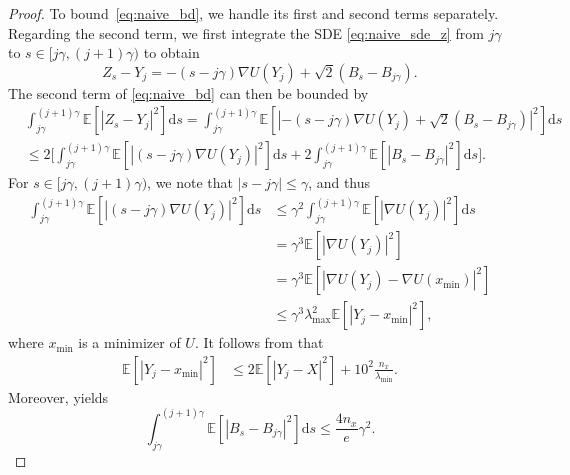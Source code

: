 \documentclass[11pt]{article}
\theoremstyle{plain}
\theoremstyle{definition}
\theoremstyle{remark}
\begin{document}
\begin{proof}
To bound~\eqref{eq:naive_bd}, we handle its first and second terms   separately. 
Regarding the second term, we first integrate the SDE \eqref{eq:naive_sde_z} from $j\gamma$ to $s \in [j \gamma, (j+1)\gamma )$  to obtain 
\begin{equation}\nonumber
 Z_s - Y_j   =    -(s - j\gamma)  \nabla U(Y_j) + \sqrt{2} (B_s - B_{j\gamma}).  
\end{equation}
The second term of \eqref{eq:naive_bd} can then be bounded  by
\begin{equation}\label{eq:naive_bd0}
\begin{split}
&\int_{j\gamma}^{(j+1) \gamma} 
\mathbb{E} [ | Z_s-Y_j|^2 ] \mathrm{d} s 
= \int_{j\gamma}^{(j+1) \gamma}\mathbb{E} [ | 
-(s - j\gamma)  \nabla U(Y_j) + \sqrt{2} (B_s - B_{j\gamma})
|^2 ] \mathrm{d} s \\
&\leq 2\bigg [
 \int_{j\gamma}^{(j+1) \gamma} \mathbb{E} [ | 
(s - j\gamma)  \nabla U(Y_j) |^2] \mathrm{d} s
+ 2 \int_{j\gamma}^{(j+1) \gamma} \mathbb{E} [|B_s - B_{j\gamma} |^2] \mathrm{d}s \bigg ].
\end{split}
\end{equation}
For $s \in [j\gamma, (j+1) \gamma)$, we note that $|s - j\gamma| \leq \gamma$, and thus
\begin{equation}\label{eq:naive_bd1}
\begin{split}
\int_{j\gamma}^{(j+1) \gamma} \mathbb{E} [ | 
(s - j\gamma)  \nabla U(Y_j) |^2] \mathrm{d} s
&\leq \gamma^2 \int_{j\gamma}^{(j+1) \gamma}  \mathbb{E} [
| \nabla U(Y_j) |^2 
] \mathrm{d} s \\
&= \gamma^3 \mathbb{E} [
| \nabla U(Y_j) |^2
] \\
&= \gamma^3 \mathbb{E} [
| \nabla U(Y_j) -  \nabla U(x_{\min}) |^2
]  \\
&\leq \gamma^3 \lambda_{\max}^2  \mathbb{E} [ | Y_j - x_{\min} |^2 ], 
\end{split}
\end{equation}
where $x_{\min}$ is a minimizer of  $U$.
It follows from  \cite[Lemma 10]{mazumdar2020thompson} that
\begin{equation}\label{eq:naive_bd2}
\begin{split}
\mathbb{E} [ | Y_j - x_{\min}|^2] & \leq 2\mathbb{E} [ | Y_j - X|^2] + 10^2 \frac{n_x}{\lambda_{\min}}.
\end{split}
\end{equation}
Moreover,  \cite[Lemma 8]{mazumdar2020thompson} yields
\begin{equation}\label{eq:naive_bd3}
\int_{j\gamma}^{(j+1)\gamma} \mathbb{E} [
| B_s - B_{j\gamma}|^2
]\mathrm{d}s \leq \frac{4n_x}{e} \gamma^2.
\end{equation}


\end{proof}
\end{document}
